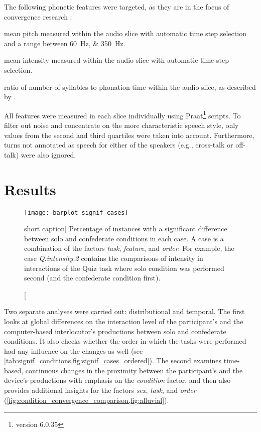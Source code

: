 The following phonetic features were targeted, as they are in the focus of convergence research \citep{Levitan2011measuring,Natale1975Conv,Gregory1993Voice}:
\begin{description}[wide=0pt, leftmargin=0.5\parindent, nosep]
	\item[\Acf{f0}] mean pitch measured within the audio slice with automatic time step selection and a range between \SIlist{60;350}{\hertz}.
	\item[Intensity] mean intensity measured within the audio slice with automatic time step selection.
	\item[\Acf{ar}] ratio of number of syllables to phonation time within the audio slice, as described by \citet{DeJong2009arcitulcationrate}.
\end{description}

All features were measured in each slice individually using Praat\footnote{version 6.0.35} \citep{Boersma2001praat} scripts.
To filter out noise and concentrate on the more characteristic speech style, only values from the second and third quartiles were taken into account.
Furthermore, turns not annotated as speech for either of the speakers (e.g., cross-talk or off-talk) were also ignored.

\section{Results}
\label{sec:results}

\begin{figure}[t]
	\centering
	\texttt{[image: barplot\_signif\_cases]}
	\caption
		[short caption]
		{Percentage of instances with a significant difference between solo and confederate conditions in each case.
		A case is a combination of the factors \emph{task}, \emph{feature}, and \emph{order}.
		For example, the case \emph{Q.intensity.2} contains the comparisons of intensity in interactions of the Quiz task where solo condition was performed second (and the confederate condition first).}
	\label{fig:signif_cases_ordered}
\end{figure}

Two separate analyses were carried out: distributional and temporal.
The first looks at global differences on the interaction level of the participant's and the computer-based interlocutor's productions between solo and confederate conditions.
It also checks whether the order in which the tasks were performed had any influence on the changes as well (see \cref{tab:signif_conditions,fig:signif_cases_ordered}).
The second examines time-based, continuous changes in the proximity between the participant's and the device's productions with emphasis on the \emph{condition} factor, and then also provides additional insights for the factors \emph{sex}, \emph{task}, and \emph{order} (\cref{fig:condition_convergence_comparison,fig:alluvial}).

